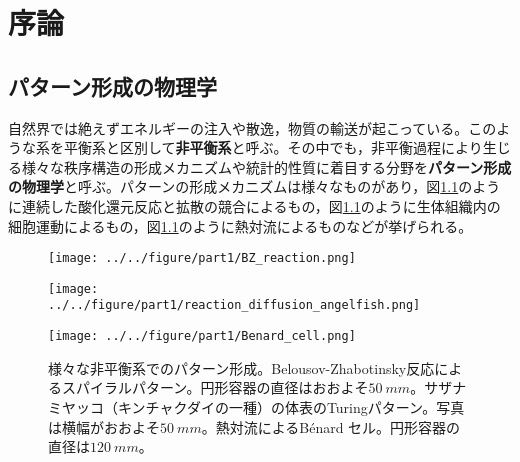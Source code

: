 \documentclass[autodetect-engine,dvi=dvipdfmx,a4paper,ja=standard,oneside,openany,11pt]{bxjsbook}
\begin{document}
\chapter{序論}
\section{パターン形成の物理学}
自然界では絶えずエネルギーの注入や散逸，物質の輸送が起こっている。このような系を平衡系と区別して\textbf{非平衡系}と呼ぶ。その中でも，非平衡過程により生じる様々な秩序構造の形成メカニズムや統計的性質に着目する分野を\textbf{パターン形成の物理学}と呼ぶ。パターンの形成メカニズムは様々なものがあり，図\ref{fig:pattern_formation}のように連続した酸化還元反応と拡散の競合によるもの，図\ref{fig:pattern_formation}のように生体組織内の細胞運動によるもの，図\ref{fig:pattern_formation}のように熱対流によるものなどが挙げられる。

\begin{figure}[htbp]
  \centering
  \begin{minipage}
    {0.32\textwidth}
    \subcaption{}
    \centering
    \texttt{[image: ../../figure/part1/BZ\_reaction.png]}
    \label{fig:BZ}
  \end{minipage}
  \begin{minipage}
    {0.32\textwidth}
    \subcaption{}
    \centering
    \texttt{[image: ../../figure/part1/reaction\_diffusion\_angelfish.png]}
    \label{fig:reaction_diffusion_angelfish}
  \end{minipage}
  \begin{minipage}
    {0.32\textwidth}
    \subcaption{}
    \centering
    \texttt{[image: ../../figure/part1/Benard\_cell.png]}
    \label{fig:Benard_cell}
  \end{minipage}
  \caption{様々な非平衡系でのパターン形成。Belousov-Zhabotinsky反応によるスパイラルパターン\cite{BZ_reaction}。円形容器の直径はおおよそ$\SI{50}{mm}$。サザナミヤッコ（キンチャクダイの一種）の体表のTuringパターン。写真は横幅がおおよそ$\SI{50}{mm}$\cite{kondo1995reaction}。熱対流によるB{\'e}nard セル。円形容器の直径は$\SI{120}{mm}${\cite{eckert1998square}}。}
  \label{fig:pattern_formation}
\end{figure}
\end{document}
